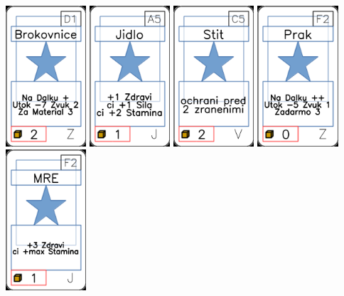 \documentclass[a4paper]{article}
\begin{document}
	\includegraphics[width=3.0cm]{img-1_105}
	\includegraphics[width=3.0cm]{img-1_4}
	\includegraphics[width=3.0cm]{img-1_74}
	\includegraphics[width=3.0cm]{img-1_86}
	\includegraphics[width=3.0cm]{img-1_26}
\end{document}
